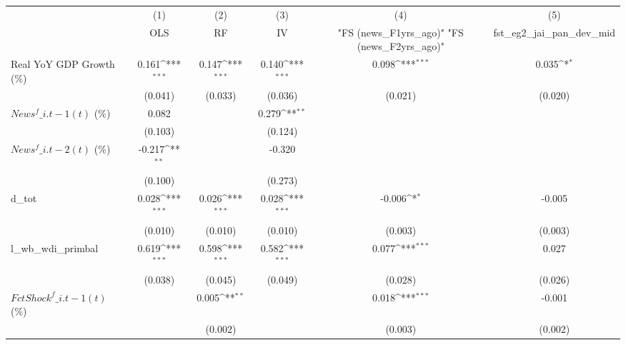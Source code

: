 {
\def\sym#1{\ifmmode^{#1}\else\(^{#1}\)\fi}
\begin{tabular}{l*{5}{c}}
\toprule
                    &\multicolumn{1}{c}{(1)}&\multicolumn{1}{c}{(2)}&\multicolumn{1}{c}{(3)}&\multicolumn{1}{c}{(4)}&\multicolumn{1}{c}{(5)}\\
                    &\multicolumn{1}{c}{OLS}&\multicolumn{1}{c}{RF}&\multicolumn{1}{c}{IV}&\multicolumn{1}{c}{ "FS (news\_F1yrs\_ago)"  "FS (news\_F2yrs\_ago)" }&\multicolumn{1}{c}{fst\_eg2\_jai\_pan\_dev\_mid}\\
\midrule
Real YoY GDP Growth (\%)&       0.161\sym{***}&       0.147\sym{***}&       0.140\sym{***}&       0.098\sym{***}&       0.035\sym{*}  \\
                    &     (0.041)         &     (0.033)         &     (0.036)         &     (0.021)         &     (0.020)         \\
\addlinespace
$ News^f\_{i.t-1}(t)$ (\%)&       0.082         &                     &       0.279\sym{**} &                     &                     \\
                    &     (0.103)         &                     &     (0.124)         &                     &                     \\
\addlinespace
$ News^f\_{i.t-2}(t)$ (\%)&      -0.217\sym{**} &                     &      -0.320         &                     &                     \\
                    &     (0.100)         &                     &     (0.273)         &                     &                     \\
\addlinespace
d\_tot               &       0.028\sym{***}&       0.026\sym{***}&       0.028\sym{***}&      -0.006\sym{*}  &      -0.005         \\
                    &     (0.010)         &     (0.010)         &     (0.010)         &     (0.003)         &     (0.003)         \\
\addlinespace
l\_wb\_wdi\_primbal    &       0.619\sym{***}&       0.598\sym{***}&       0.582\sym{***}&       0.077\sym{***}&       0.027         \\
                    &     (0.038)         &     (0.045)         &     (0.049)         &     (0.028)         &     (0.026)         \\
\addlinespace
$ FctShock^f\_{i.t-1}(t)$ (\%)&                     &       0.005\sym{**} &                     &       0.018\sym{***}&      -0.001         \\
                    &                     &     (0.002)         &                     &     (0.003)         &     (0.002)         \\

\end{tabular}}
